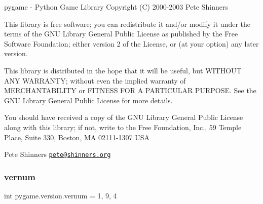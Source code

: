 pygame -\/ Python Game Library Copyright (C) 2000-\/2003 Pete Shinners 

This library is free software; you can redistribute it and/or modify it under the terms of the G\+NU Library General Public License as published by the Free Software Foundation; either version 2 of the License, or (at your option) any later version.

This library is distributed in the hope that it will be useful, but W\+I\+T\+H\+O\+UT A\+NY W\+A\+R\+R\+A\+N\+TY; without even the implied warranty of M\+E\+R\+C\+H\+A\+N\+T\+A\+B\+I\+L\+I\+TY or F\+I\+T\+N\+E\+SS F\+OR A P\+A\+R\+T\+I\+C\+U\+L\+AR P\+U\+R\+P\+O\+SE. See the G\+NU Library General Public License for more details.

You should have received a copy of the G\+NU Library General Public License along with this library; if not, write to the Free Foundation, Inc., 59 Temple Place, Suite 330, Boston, MA 02111-\/1307 U\+SA

Pete Shinners \href{mailto:pete@shinners.org}{\tt pete@shinners.\+org} \mbox{\label{namespacepygame_1_1version_a75b9362c07f0bb99872231dfc6ebef03}} 
\subsubsection{\texorpdfstring{vernum}{vernum}}
{\footnotesize\ttfamily int pygame.\+version.\+vernum = 1, 9, 4}

